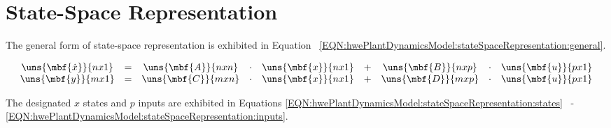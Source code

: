 \documentclass[crop=false,float=true,class=scrreprt]{standalone}
\begin{document}
\section{State-Space Representation}
\label{SEC:hwePlantDynamicsModel:stateSpaceRepresentation}

The general form of state-space representation is exhibited in Equation~%
\eqref{EQN:hwePlantDynamicsModel:stateSpaceRepresentation:general}.

\vspace{-1em}

\begin{equation}
\label{EQN:hwePlantDynamicsModel:stateSpaceRepresentation:general}
\begin{array}{ccccccccc}
\uns{\mbf{\dot{x}}}{n x 1}
& = &
\uns{\mbf{A}}{n x n} 
& \cdot &
\uns{\mbf{x}}{n x 1} 
& + & 
\uns{\mbf{B}}{n x p} 
& \cdot &
\uns{\mbf{u}}{p x 1} 
\\
\uns{\mbf{y}}{m x 1} 
& = &
\uns{\mbf{C}}{m x n} 
& \cdot &
\uns{\mbf{x}}{n x 1} 
& + &
\uns{\mbf{D}}{m x p} 
& \cdot &
\uns{\mbf{u}}{p x 1}
\end{array}
\end{equation}




The designated $x$ states and $p$ inputs are exhibited in Equations
\eqref{EQN:hwePlantDynamicsModel:stateSpaceRepresentation:states}~%
-~%
\eqref{EQN:hwePlantDynamicsModel:stateSpaceRepresentation:inputs}.


\vspace{+1em}
\end{document}
